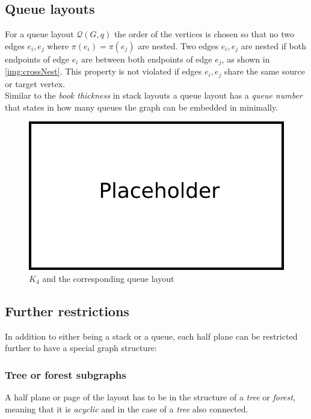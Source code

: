 \subsection{Queue layouts}
For a queue layout $\mathcal{Q}(G,q)$ the order of the vertices is chosen so that no two edges $e_i, e_j$ where $\pi(e_i) = \pi(e_j)$ are nested. Two edges $e_i, e_j$ are nested if both endpoints of edge $e_i$ are between both endpoints of edge $e_j$, as shown in \autoref{img:crossNest}. This property is not violated if edges $e_i, e_j$ share the same source or target vertex.\\
Similar to the \textit{book thickness} in stack layouts a queue layout has a \textit{queue number} that states in how many queues the graph can be embedded in minimally.\\
\begin{figure}[!h]
\begin{center}
\includegraphics[width=1\textwidth]{figures/Platzhalter.png}
\caption{$K_4$ and the corresponding queue layout}
\label{img:queueK4}
\end{center}
\end{figure}
\subsection{Further restrictions}
In addition to either being a stack or a queue, each half plane can be restricted further to have a special graph structure:
\subsubsection{Tree or forest subgraphs}
A half plane or page of the layout has to be in the structure of a \textit{tree} or \textit{forest}, meaning that it is \textit{acyclic} and in the case of a \textit{tree} also connected.
